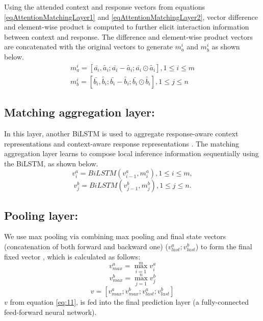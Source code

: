 \documentclass[letterpaper]{article} %
\begin{document}
Using the attended context and response vectors from equations \ref{eqAttentionMatchingLayer1} and \ref{eqAttentionMatchingLayer2}, vector difference and element-wise product is computed
to further elicit interaction information between context and response. The difference and element-wise product vectors are concatenated with the original vectors to generate $m_a^i$ and $m_b^i$ as shown below. %
\begin{gather}
\label{eq:5}
m_a^i = [\bar{a_i},\tilde{a_i};\bar{a_i}-\tilde{a_i}; \bar{a_i}\odot\tilde{a_i}], 1 \leq i \leq m \\
\label{eq:6}
m_b^i = [\bar{b_i},\tilde{b_i};\bar{b_i}-\tilde{b_i}; \bar{b_i}\odot\tilde{b_i}], 1 \leq j \leq n
\end{gather}

\subsection{Matching aggregation layer:}
In this layer, another BiLSTM is used to aggregate response-aware context representations and context-aware response representations \cite{chen2017enhanced}. The matching aggregation layer learns to compose local inference information sequentially using the BiLSTM, as shown below.
\begin{equation}
\label{eq:7}
v_i^a = BiLSTM(v_{i-1}^a,m_i^a), 1\leq i \leq m,
\end{equation}
\begin{equation}
\label{eq:8}
v_j^b = BiLSTM(v_{j-1}^b,m_j^b), 1\leq j \leq n.
\end{equation}
\subsection{Pooling layer:}
We use max pooling via combining max pooling and final state vectors (concatenation of both forward and backward one) ($v_{last}^a ; v_{last}^b$) to form the final fixed vector \cite{dong2018enhance}, which is calculated as follows:
\begin{equation}
\label{eq:9}
v_{max}^a = \max_{i=1}^m v_i^a
\end{equation}
\begin{equation}
\label{eq:10}
v_{max}^b = \max_{j=1}^n v_j^b
\end{equation}
\begin{equation}
\label{eq:11}
v = [v_{max}^a;v_{max}^b;v_{last}^a;v_{last}^b]
\end{equation}
$v$ from equation \ref{eq:11}, is fed into the final prediction layer (a fully-connected feed-forward neural network).
\end{document}
